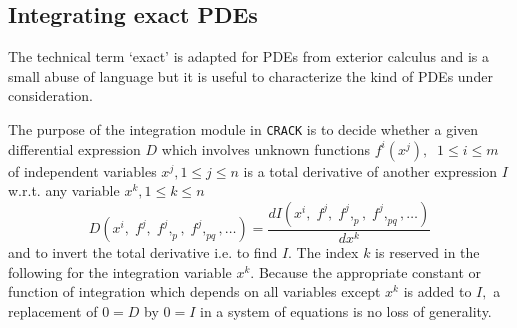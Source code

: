 \subsection{Integrating exact PDEs}
The technical term `exact' is adapted for PDEs from exterior calculus and
is a small abuse of language but it is useful to characterize the kind of PDEs
under consideration.

The purpose of the integration module in {\tt CRACK} is to  decide
whether a given differential
expression $D$ which involves unknown functions $f^i(x^j),\;\; 1\leq i\leq m$ 
of independent variables $x^j, 1\leq j\leq n$
is a total derivative of another expression $I$
w.r.t. any variable $x^k, 1\leq k\leq n$ 
\[ D(x^i,\; f^j,\; f^j,_p,\; f^j,_{pq}, \ldots) 
     = \frac{d I(x^i,\; f^j,\; f^j,_p,\; f^j,_{pq}, \ldots)}{d x^k} \]
and to invert the total derivative i.e. to find $I.$ The index $k$ is
reserved in the following for the integration variable $x^k.$ Because
the appropriate constant or function of integration which depends on
all variables except $x^k$ is added to $I,$ a replacement of $0 = D$
by $0 = I$ in a system of equations is no loss of generality.

